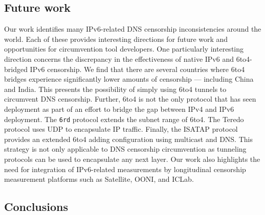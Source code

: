 
\subsection{Future work}
\label{sec:discussion:future}
Our work identifies many IPv6-related DNS censorship inconsistencies around the
world. Each of these provides interesting directions for future work and
opportunities for circumvention tool developers.
%
One particularly interesting direction concerns the discrepancy in the
effectiveness of native IPv6 and 6to4-bridged IPv6 censorship. We find that
there are several countries where 6to4 bridges experience significantly lower
amounts of censorship --- including China and India. This presents the
possibility of simply using 6to4 tunnels to circumvent DNS censorship. 
%
Further, 6to4 is not the only protocol that has seen deployment as part of an
effort to bridge the gap between IPv4 and IPv6 deployment. The \texttt{6rd}
protocol extends the subnet range of 6to4. The Teredo protocol uses UDP to
encapsulate IP traffic. Finally, the ISATAP protocol provides an extended 6to4
adding configuration using multicast and DNS. This strategy is not only
applicable to DNS censorship circumvention as tunneling protocols can be used to
encapsulate any next layer.
%
Our work also highlights the need for integration of IPv6-related measurements
by longitudinal censorship measurement platforms such as Satellite, OONI, and
ICLab. 

\subsection{Conclusions} \label{sec:discussion:conclusions}

